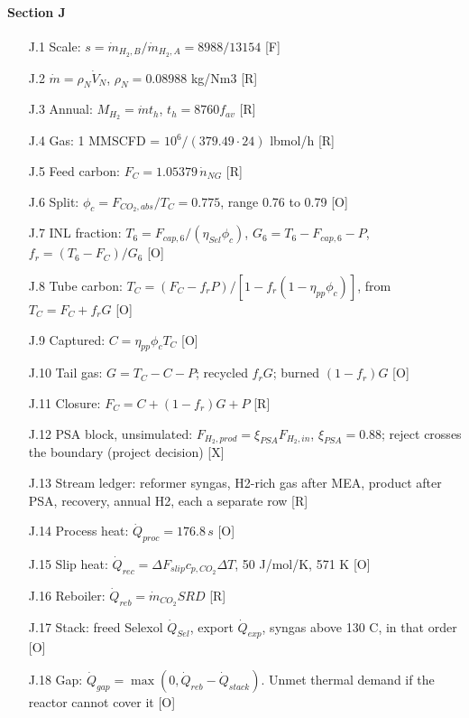 \paragraph{Section J}
\begin{enumerate}[leftmargin=1.4cm,itemsep=0pt,topsep=2pt,parsep=0pt]\small
\item[J.1] Scale: $s=\dot m_{H_2,B}/\dot m_{H_2,A}=8988/13154$ {\footnotesize [F]}
\item[J.2] $\dot m=\rho_N\dot V_N$, $\rho_N=0.08988$ kg/Nm3 {\footnotesize [R]}
\item[J.3] Annual: $M_{H_2}=\dot mt_h$, $t_h=8760f_{av}$ {\footnotesize [R]}
\item[J.4] Gas: 1 MMSCFD = $10^6/(379.49\cdot24)$ lbmol/h {\footnotesize [R]}
\item[J.5] Feed carbon: $F_C=1.05379\,\dot n_{NG}$ {\footnotesize [R]}
\item[J.6] Split: $\phi_c=F_{CO_2,abs}/T_C=0.775$, range 0.76 to 0.79 {\footnotesize [O]}
\item[J.7] INL fraction: $T_6=F_{cap,6}/(\eta_{Sel}\phi_c)$, $G_6=T_6-F_{cap,6}-P$, $f_r=(T_6-F_C)/G_6$ {\footnotesize [O]}
\item[J.8] Tube carbon: $T_C=(F_C-f_rP)/[1-f_r(1-\eta_{pp}\phi_c)]$, from $T_C=F_C+f_rG$ {\footnotesize [O]}
\item[J.9] Captured: $C=\eta_{pp}\phi_cT_C$ {\footnotesize [O]}
\item[J.10] Tail gas: $G=T_C-C-P$; recycled $f_rG$; burned $(1-f_r)G$ {\footnotesize [O]}
\item[J.11] Closure: $F_C=C+(1-f_r)G+P$ {\footnotesize [R]}
\item[J.12] PSA block, unsimulated: $F_{H_2,prod}=\xi_{PSA}F_{H_2,in}$, $\xi_{PSA}=0.88$; reject crosses the boundary (project decision) {\footnotesize [X]}
\item[J.13] Stream ledger: reformer syngas, H2-rich gas after MEA, product after PSA, recovery, annual H2, each a separate row {\footnotesize [R]}
\item[J.14] Process heat: $\dot Q_{proc}=176.8\,s$ {\footnotesize [O]}
\item[J.15] Slip heat: $\dot Q_{rec}=\Delta F_{slip}c_{p,CO_2}\Delta T$, 50 J/mol/K, 571 K {\footnotesize [O]}
\item[J.16] Reboiler: $\dot Q_{reb}=\dot m_{CO_2}SRD$ {\footnotesize [R]}
\item[J.17] Stack: freed Selexol $\dot Q_{Sel}$, export $\dot Q_{exp}$, syngas above 130 C, in that order {\footnotesize [O]}
\item[J.18] Gap: $\dot Q_{gap}=\max(0,\dot Q_{reb}-\dot Q_{stack})$. Unmet thermal demand if the reactor cannot cover it {\footnotesize [O]}

\end{enumerate}
